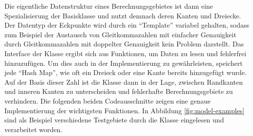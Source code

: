 \documentclass[crop=false,10pt,ngerman]{standalone}
\begin{document}
      Die eigentliche Datenstruktur  eines Berechnungsgebietes ist dann eine Spezialisierung der Basisklasse  und nutzt demnach deren Kanten und Dreiecke.
      Der Datentyp der Eckpunkte wird durch ein \enquote{Template} variabel gehalten, sodass zum Beispiel der Austausch von Gleitkommazahlen mit einfacher Genauigkeit durch Gleitkommazahlen mit doppelter Genauigkeit kein Problem darstellt.
      Das Interface der Klasse ergibt sich aus Funktionen, um Daten zu lesen und fehlerfrei hinzuzufügen.
      Um dies auch in der Implementierung zu gewährleisten, speichert jede \enquote{Hash Map}, wie oft ein Dreieck oder eine Kante bereits hinzugefügt wurde.
      Auf der Basis dieser Zahl ist die Klasse dann in der Lage, zwischen Randkanten und inneren Kanten zu unterscheiden und fehlerhafte Berechnungsgebiete zu verhindern.
      Die folgenden beiden Codeausschnitte zeigen eine genaue Implementierung der wichtigsten Funktionen.
      In Abbildung \ref{fig:model-examples} sind als Beispiel verschiedene Testgebiete durch die Klasse  eingelesen und verarbeitet worden.

\end{document}
